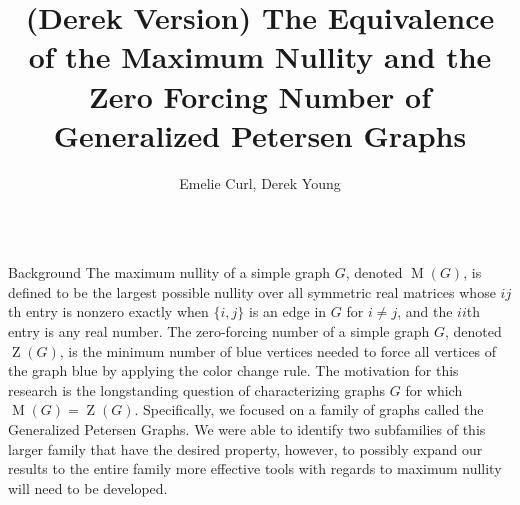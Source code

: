 \documentclass[final]{beamer}
\title{(Derek Version) The Equivalence of the Maximum Nullity and the Zero Forcing Number of Generalized Petersen Graphs}
\author{Emelie Curl, Derek Young }
\institute{Iowa State University, Ames, IA}
\def\red{\color{red}}
\newcommand{\M}{\operatorname{M}}
\newcommand{\Z}{\operatorname{Z}}
\newcommand{\R}{\mathbb{R}}
\newcommand{\Rnn}{\R^{n\times n}}
\newcommand{\bit}{\begin{itemize}}
\begin{document}
\begin{frame}{}
\begin{columns}[t]


\begin{column}{0.23\linewidth} 

\begin{block}{\red Background}
The maximum nullity of a simple graph $G$, denoted $\M(G)$, is defined to be the largest possible nullity over all symmetric real matrices whose $ij$th entry is nonzero exactly when $\{i,j\}$ is an edge in $G$ for $i\neq j$, and the {$ii$}th entry is any real number. The zero-forcing number of a simple graph $G$, denoted $\Z(G)$, is the minimum number of blue vertices needed to force all vertices of the graph blue by applying the color change rule. The motivation for this research is the longstanding question of characterizing graphs $G$ for which $\M(G) = \Z(G)$. Specifically, we focused on a family of graphs called the Generalized Petersen Graphs. We were able to identify two subfamilies of this larger family that have the desired property, however, to possibly expand our results to the entire family more effective tools with regards to maximum nullity will need to be developed.
\end{block}

\end{column}
\end{columns}
\end{frame}
\end{document}
